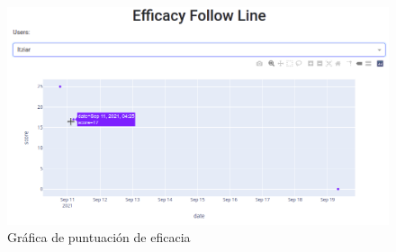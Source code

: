 \begin{figure}[H]
    \centering
    \includegraphics[width=17cm, keepaspectratio]{img/score_efficacy.png}
    \caption{Gráfica de puntuación de eficacia}
    \label{fig:score_efficacy}
\end{figure}









